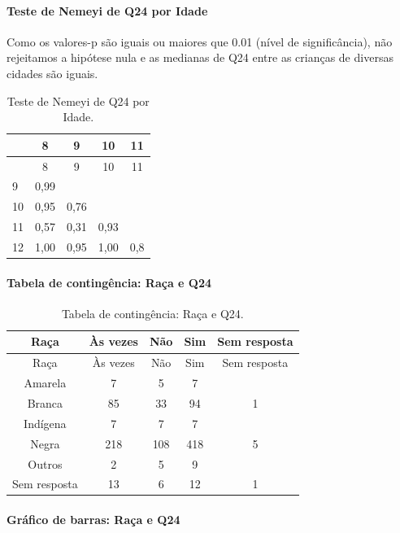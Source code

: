 \documentclass[]{article}
\let\oldparagraph\paragraph
\renewcommand{\paragraph}[1]{\oldparagraph{#1}\mbox{}}
\begin{document}
\hypertarget{teste-de-nemeyi-de-q24-por-idade}{%
\paragraph{Teste de Nemeyi de Q24 por Idade}\label{teste-de-nemeyi-de-q24-por-idade}}

Como os valores-p são iguais ou maiores que 0.01 (nível de significância), não rejeitamos a hipótese nula e as medianas de Q24 entre as crianças de diversas cidades são iguais.

\begin{longtable}[]{@{}lcccc@{}}
\caption{\label{tab:unnamed-chunk-631}Teste de Nemeyi de Q24 por Idade.}\tabularnewline
\toprule
& 8 & 9 & 10 & 11\tabularnewline
\midrule
\endfirsthead
\toprule
& 8 & 9 & 10 & 11\tabularnewline
\midrule
\endhead
9 & 0,99 & & &\tabularnewline
10 & 0,95 & 0,76 & &\tabularnewline
11 & 0,57 & 0,31 & 0,93 &\tabularnewline
12 & 1,00 & 0,95 & 1,00 & 0,8\tabularnewline
\bottomrule
\end{longtable}

\cleardoublepage

\hypertarget{tabela-de-continguxeancia-rauxe7a-e-q24}{%
\paragraph{Tabela de contingência: Raça e Q24}\label{tabela-de-continguxeancia-rauxe7a-e-q24}}

\begin{longtable}[]{@{}ccccc@{}}
\caption{\label{tab:unnamed-chunk-632}Tabela de contingência: Raça e Q24.}\tabularnewline
\toprule
Raça & Às vezes & Não & Sim & Sem resposta\tabularnewline
\midrule
\endfirsthead
\toprule
Raça & Às vezes & Não & Sim & Sem resposta\tabularnewline
\midrule
\endhead
Amarela & 7 & 5 & 7 &\tabularnewline
Branca & 85 & 33 & 94 & 1\tabularnewline
Indígena & 7 & 7 & 7 &\tabularnewline
Negra & 218 & 108 & 418 & 5\tabularnewline
Outros & 2 & 5 & 9 &\tabularnewline
Sem resposta & 13 & 6 & 12 & 1\tabularnewline
\bottomrule
\end{longtable}

\hypertarget{gruxe1fico-de-barras-rauxe7a-e-q24}{%
\paragraph{Gráfico de barras: Raça e Q24}\label{gruxe1fico-de-barras-rauxe7a-e-q24}}
\end{document}
